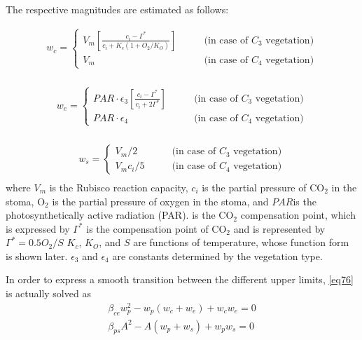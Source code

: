 The respective magnitudes are estimated as follows:

\begin{eqnarray}
 w_c = \left\{
\begin{array}{ll}
\displaystyle{
V_m \left[ \frac{c_i - \Gamma^\ast}{c_i + K_c(1+O_2/K_O)}\right]
}
   & \qquad\text{(in case of $C_3$ vegetation)}\\
 V_m
   & \qquad\text{(in case of $C_4$ vegetation)}
\end{array}
\right. \\
\end{eqnarray}

\begin{eqnarray}
 w_e = \left\{
\begin{array}{ll}
\displaystyle{
PAR\cdot \epsilon_3 \left[ \frac{c_i-\Gamma^\ast }{c_i+2\Gamma^\ast}\right]
}
  & \qquad\text{(in case of $C_3$ vegetation)}\\
PAR\cdot \epsilon_4
  & \qquad\text{(in case of $C_4$ vegetation)}
\end{array}
\right. \\
\end{eqnarray}

\begin{eqnarray}
 w_s = \left\{
\begin{array}{ll}
V_m / 2
  & \qquad\text{(in case of $C_3$ vegetation)}\\
V_m c_i/ 5
  & \qquad\text{(in case of $C_4$ vegetation)}
\end{array}
\right. \\
\end{eqnarray} where \(V_m\) is the Rubisco reaction capacity, \(c_i\) is the partial pressure of \(\mathrm{CO_2}\) in the stoma, \(\mathrm{O_2}\) is the partial pressure of oxygen in the stoma, and \(PAR\)is the
photosynthetically active radiation (PAR). is the \(\mathrm{CO_2}\) compensation point, which is expressed by \(\Gamma^*\) is the compensation point of \(\mathrm{CO_2}\) and is represented by
\(\Gamma^* = 0.5 O_2 / S\) \(K_c\), \(K_O\), and \(S\) are functions of temperature, whose function form is shown later. \(\epsilon_3\) and \(\epsilon_4\) are constants determined by the vegetation
type.

In order to express a smooth transition between the different upper limits, \ref{eq76} is actually solved as \begin{eqnarray}
 \beta_{ce} w_p^2 - w_p(w_c + w_e) + w_c w_e = 0 \\
 \beta_{ps} A^2 - A(w_p + w_s) + w_p w_s = 0
\end{eqnarray}

